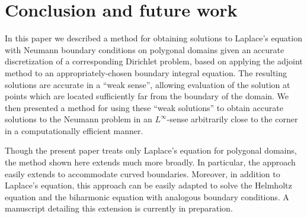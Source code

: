 
\section{Conclusion and future work}

In this paper we described a method for obtaining solutions to Laplace's equation with Neumann boundary conditions 
on polygonal domains given an accurate discretization of a corresponding Dirichlet problem, based on applying the 
adjoint method to an appropriately-chosen boundary integral equation. The resulting solutions are accurate in a 
``weak sense'', allowing evaluation of the solution at points which are located sufficiently far from the boundary of the 
domain. We then presented a method for using these ``weak solutions'' to obtain accurate solutions to the Neumann problem 
in an $L^\infty$-sense arbitrarily close to the corner in a computationally efficient manner. 

Though the present paper treats only Laplace's equation for polygonal domains, the method shown here extends 
much more broadly. In particular, the approach easily extends to accommodate curved boundaries. Moreover, in addition 
to Laplace's equation, this approach can be easily adapted to solve the Helmholtz equation and the biharmonic equation with analogous boundary conditions. A manuscript detailing this extension is currently in preparation.